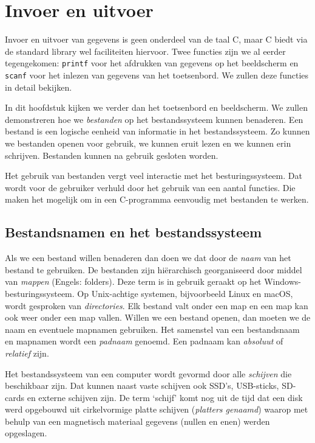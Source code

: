 \chapter{Invoer en uitvoer}
\label{cha:io}
\thispagestyle{empty}

Invoer en uitvoer van gegevens is geen onderdeel van de taal C, maar C biedt via de standard library wel faciliteiten hiervoor. Twee functies zijn we al eerder tegengekomen: \texttt{printf} voor het afdrukken van gegevens op het beeldscherm en \texttt{scanf} voor het inlezen van gegevens van het toetsenbord. We zullen deze functies in detail bekijken.

In dit hoofdstuk kijken we verder dan het toetsenbord en beeldscherm. We zullen demonstreren hoe we \textsl{bestanden} op het bestandssysteem kunnen benaderen. Een bestand is een logische eenheid van informatie in het bestandssysteem. Zo kunnen we bestanden openen voor gebruik, we kunnen eruit lezen en we kunnen erin schrijven. Bestanden kunnen na gebruik gesloten worden.

Het gebruik van bestanden vergt veel interactie met het besturingssysteem. Dat wordt voor de gebruiker verhuld door het gebruik van een aantal functies. Die maken het mogelijk om in een C-programma eenvoudig met bestanden te werken.


\section{Bestandsnamen en het bestandssysteem}
Als we een bestand willen benaderen dan doen we dat door de \textsl{naam} van het bestand te gebruiken. De bestanden zijn hiërarchisch georganiseerd door middel van \textsl{mappen} (Engels: folders). Deze term is in gebruik geraakt op het Windows-besturingssysteem. Op Unix-achtige systemen, bijvoorbeeld Linux en macOS, wordt gesproken van \textsl{directories}. Elk bestand valt onder een map en een map kan ook weer onder een map vallen. Willen we een bestand openen, dan moeten we de naam en eventuele mapnamen gebruiken. Het samenstel van een bestandsnaam en mapnamen wordt een \textsl{padnaam} genoemd. Een padnaam kan \textsl{absoluut} of \textsl{relatief} zijn.

Het bestandssysteem van een computer wordt gevormd door alle \textsl{schijven} die beschikbaar zijn. Dat kunnen naast vaste schijven ook SSD's, USB-sticks, SD-cards en externe schijven zijn. De term `schijf' komt nog uit de tijd dat een disk werd opgebouwd uit cirkelvormige platte schijven (\textsl{platters genaamd}) waarop met behulp van een magnetisch materiaal gegevens (nullen en enen) werden opgeslagen.


